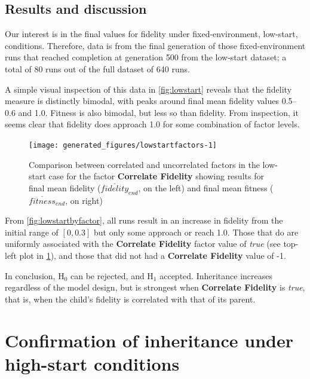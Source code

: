 \subsection{Results and discussion}

Our interest is in the final values for fidelity under fixed-environment, low-start, conditions. Therefore, data is from the final generation of those fixed-environment runs that reached completion at generation 500 from the low-start dataset; a total of 80 runs out of the full dataset of 640 runs.

A simple visual inspection of this data in \cref{fig:lowstart} reveals that the fidelity measure is distinctly bimodal, with peaks around final mean fidelity values 0.5--0.6 and 1.0. Fitness is also bimodal, but less so than fidelity. From inspection, it seems clear that fidelity does approach 1.0 for some combination of factor levels.

\begin{knitrout}
\color{fgcolor}\begin{figure}[htp]
\texttt{[image: generated\_figures/lowstartfactors-1]} \caption[Comparison between correlated and uncorrelated factors in the low-start case for the factor \textbf{Correlate Fidelity} showing results for final mean fidelity (]{Comparison between correlated and uncorrelated factors in the low-start case for the factor \textbf{Correlate Fidelity} showing results for final mean fidelity ($\overline{fidelity}_{end}$, on the left) and final mean fitness ($\overline{fitness}_{end}$, on right)}\label{fig:lowstartfactors}
\end{figure}


\end{knitrout}

From \cref{fig:lowstartbyfactor}, all runs result in an increase in fidelity from the initial range of $[0, 0.3]$ but only some approach or reach 1.0. Those that do are uniformly associated with the \textbf{Correlate Fidelity} factor value of \emph{true} (see top-left plot in \cref{fig:lowstartfactors}), and those that did not had a \textbf{Correlate Fidelity} value of -1.

In conclusion, H$_0$ can be rejected, and H$_1$ accepted. Inheritance increases regardless of the model design, but is strongest when \textbf{Correlate Fidelity} is \emph{true}, that is, when the child's fidelity is correlated with that of its parent.

\section{Confirmation of inheritance under high-start conditions}\label{inheritance-high-start}

